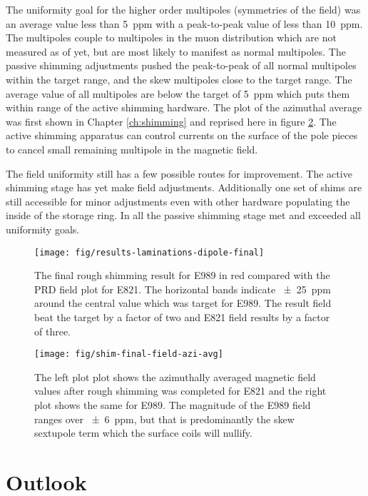 The uniformity goal for the higher order multipoles (symmetries of the field) was an average value less than \SI{5}{ppm} with a peak-to-peak value of less than \SI{10}{ppm}.  The multipoles couple to multipoles in the muon distribution which are not measured as of yet, but are most likely to manifest as normal multipoles.  The passive shimming adjustments pushed the peak-to-peak of all normal multipoles within the target range, and the skew multipoles close to the target range.  The average value of all multipoles are below the target of \SI{5}{ppm} which puts them within range of the active shimming hardware.  The plot of the azimuthal average was first shown in Chapter \ref{ch:shimming} and reprised here in figure \ref{fig:conclusion-azi-avg}.  The active shimming apparatus can control currents on the surface of the pole pieces to cancel small remaining multipole in the magnetic field.

The field uniformity still has a few possible routes for improvement.  The active shimming stage has yet make field adjustments.  Additionally one set of shims are still accessible for minor adjustments even with other hardware populating the inside of the storage ring. In all the passive shimming stage met and exceeded all uniformity goals.

\begin{figure}
\centering
\texttt{[image: fig/results-laminations-dipole-final]}
\caption{The final rough shimming result for E989 in red compared with the PRD field plot for E821.  The horizontal bands indicate \SI{\pm 25}{ppm} around the central value which was target for E989.  The result field beat the target by a factor of two and E821 field results by a factor of three. \label{fig:conclusions-dipole-final}}
\end{figure}

\begin{figure}
\centering
\texttt{[image: fig/shim-final-field-azi-avg]}
\caption{
    The left plot plot shows the azimuthally averaged magnetic field values after rough shimming was completed for E821 and the right plot shows the same for E989.  The magnitude of the E989 field ranges over \SI{\pm 6}{ppm}, but that is predominantly the skew sextupole term which the surface coils will nullify.
    \label{fig:conclusion-azi-avg}
}
\end{figure}

\section{Outlook}

